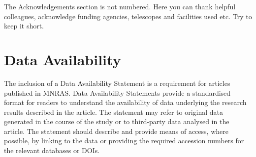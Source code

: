 \documentclass[fleqn,usenatbib]{mnras}
\begin{document}
The Acknowledgements section is not numbered. Here you can thank helpful
colleagues, acknowledge funding agencies, telescopes and facilities used etc.
Try to keep it short.

\section*{Data Availability}
 
The inclusion of a Data Availability Statement is a requirement for articles published in MNRAS. Data Availability Statements provide a standardised format for readers to understand the availability of data underlying the research results described in the article. The statement may refer to original data generated in the course of the study or to third-party data analysed in the article. The statement should describe and provide means of access, where possible, by linking to the data or providing the required accession numbers for the relevant databases or DOIs.








\appendix


\bsp	%
\label{lastpage}
\end{document}
